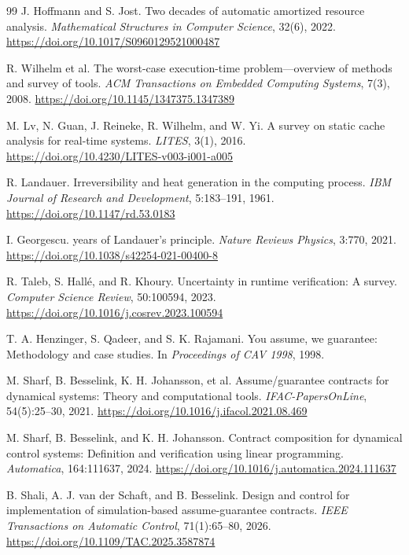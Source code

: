 \begin{thebibliography}{99}
J. Hoffmann and S. Jost.
\newblock Two decades of automatic amortized resource analysis.
\newblock \emph{Mathematical Structures in Computer Science}, 32(6), 2022.
\newblock \url{https://doi.org/10.1017/S0960129521000487}

R. Wilhelm et al.
\newblock The worst-case execution-time problem---overview of methods and survey of tools.
\newblock \emph{ACM Transactions on Embedded Computing Systems}, 7(3), 2008.
\newblock \url{https://doi.org/10.1145/1347375.1347389}

M. Lv, N. Guan, J. Reineke, R. Wilhelm, and W. Yi.
\newblock A survey on static cache analysis for real-time systems.
\newblock \emph{LITES}, 3(1), 2016.
\newblock \url{https://doi.org/10.4230/LITES-v003-i001-a005}

R. Landauer.
\newblock Irreversibility and heat generation in the computing process.
\newblock \emph{IBM Journal of Research and Development}, 5:183--191, 1961.
\newblock \url{https://doi.org/10.1147/rd.53.0183}

I. Georgescu.
 years of Landauer's principle.
\newblock \emph{Nature Reviews Physics}, 3:770, 2021.
\newblock \url{https://doi.org/10.1038/s42254-021-00400-8}

R. Taleb, S. Hall\'e, and R. Khoury.
\newblock Uncertainty in runtime verification: A survey.
\newblock \emph{Computer Science Review}, 50:100594, 2023.
\newblock \url{https://doi.org/10.1016/j.cosrev.2023.100594}

T. A. Henzinger, S. Qadeer, and S. K. Rajamani.
\newblock You assume, we guarantee: Methodology and case studies.
\newblock In \emph{Proceedings of CAV 1998}, 1998.

M. Sharf, B. Besselink, K. H. Johansson, et al.
\newblock Assume/guarantee contracts for dynamical systems: Theory and computational
tools.
\newblock \emph{IFAC-PapersOnLine}, 54(5):25--30, 2021.
\newblock \url{https://doi.org/10.1016/j.ifacol.2021.08.469}

M. Sharf, B. Besselink, and K. H. Johansson.
\newblock Contract composition for dynamical control systems: Definition and
verification using linear programming.
\newblock \emph{Automatica}, 164:111637, 2024.
\newblock \url{https://doi.org/10.1016/j.automatica.2024.111637}

B. Shali, A. J. van der Schaft, and B. Besselink.
\newblock Design and control for implementation of simulation-based assume-guarantee
contracts.
\newblock \emph{IEEE Transactions on Automatic Control}, 71(1):65--80, 2026.
\newblock \url{https://doi.org/10.1109/TAC.2025.3587874}


\end{thebibliography}
